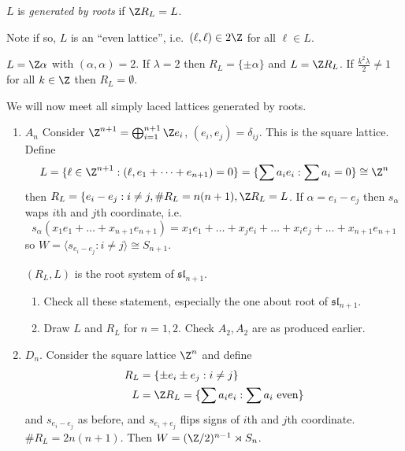 \documentclass[a4paper]{article}
\newcommand*{\Lie}[1]{\mathfrak{#1}} %
\begin{document}
\begin{definition}
  \(L\) is \emph{generated by roots} if \(\Z R_L = L\).
\end{definition}

Note if so, \(L\) is an ``even lattice'', i.e.\ \((\ell, \ell) \in 2\Z\) for all \(\ell \in L\).

\begin{eg}
  \(L = \Z \alpha\) with \((\alpha, \alpha) = 2\). If \(\lambda = 2\) then \(R_L = \{\pm \alpha\}\) and \(L = \Z R_L\). If \(\frac{k^2\lambda}{2} \neq 1\) for all \(k \in \Z\) then \(R_L = \emptyset\).
\end{eg}

We will now meet all simply laced lattices generated by roots.
\begin{enumerate}
\item \(A_n\) Consider \(\Z^{n + 1} = \bigoplus_{i = 1}^{n + 1} \Z e_i\), \((e_i, e_j) = \delta_{ij}\). This is the square lattice. Define
  \[
    L = \{\ell \in \Z^{n + 1}: (\ell, e_1 + \dots + e_{n + 1}) = 0\}
    = \{\sum a_i e_i: \sum a_i = 0\} \cong \Z^n
  \]
  then \(R_L = \{e_i - e_j: i \neq j, \# R_L = n(n + 1), \Z R_L = L\). If \(\alpha = e_i - e_j\) then \(s_\alpha\) waps \(i\)th and \(j\)th coordinate, i.e.
  \[
    s_\alpha(x_1e_1 + \dots + x_{n + 1} e_{n + 1}) = x_1e_1 + \dots + x_je_i + \dots + x_ie_j + \dots + x_{n + 1} e_{n + 1}
  \]
  so \(W = \langle s_{e_i - e_j}: i \neq j\rangle \cong S_{n + 1}\).

  \((R_L, L)\) is the root system of \(\Lie{sl}_{n + 1}\).

  \begin{ex}\leavevmode
    \begin{enumerate}
    \item Check all these statement, especially the one about root of \(\Lie{sl}_{n + 1}\).
    \item Draw \(L\) and \(R_L\) for \(n = 1, 2\). Check \(A_2, A_2\) are as produced earlier.
    \end{enumerate}
  \end{ex}
\item \(D_n\). Consider the square lattice \(\Z^n\) and define
  \begin{align*}
    R_L &= \{\pm e_i \pm e_j: i \neq j\} \\
    L &= \Z R_L = \{\sum a_i e_i: \sum a_i \text{ even}\}
  \end{align*}
  and \(s_{e_i - e_j}\) as before, and \(s_{e_i + e_j}\) flips signs of \(i\)th and \(j\)th coordinate. \(\# R_L = 2n(n + 1)\). Then \(W = (\Z/2)^{n - 1} \rtimes S_n\).


\end{enumerate}
\end{document}
